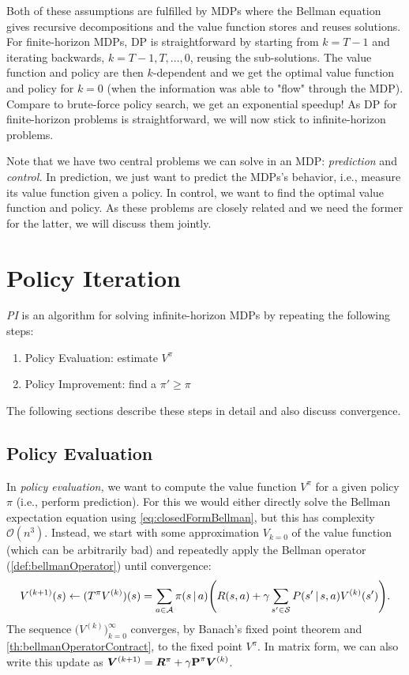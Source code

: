 	Both of these assumptions are fulfilled by \acp{MDP} where the Bellman equation gives recursive decompositions and the value function stores and reuses solutions. For finite-horizon \acp{MDP}, \ac{DP} is straightforward by starting from \(k = T - 1\) and iterating backwards, \(k = T - 1, T, \dots, 0\), reusing the sub-solutions. The value function and policy are then \(k\)-dependent and we get the optimal value function and policy for \(k = 0\) (when the information was able to "flow" through the \ac{MDP}). Compare to brute-force policy search, we get an exponential speedup! As \ac{DP} for finite-horizon problems is straightforward, we will now stick to infinite-horizon problems.

	Note that we have two central problems we can solve in an \ac{MDP}: \emph{prediction} and \emph{control.} In prediction, we just want to predict the \acp{MDP}'s behavior, i.e., measure its value function given a policy. In control, we want to find the optimal value function and policy. As these problems are closely related and we need the former for the latter, we will discuss them jointly.

	\section{Policy Iteration}
		\emph{\ac{PI}} is an algorithm for solving infinite-horizon \acp{MDP} by repeating the following steps:
		\begin{enumerate}
			\item Policy Evaluation: estimate \(V^\pi\)
			\item Policy Improvement: find a \(\pi' \geq \pi\)
		\end{enumerate}
		The following sections describe these steps in detail and also discuss convergence.

		\subsection{Policy Evaluation}
			In \emph{policy evaluation,} we want to compute the value function \(V^\pi\) for a given policy \(\pi\) (i.e., perform prediction). For this we would either directly solve the Bellman expectation equation using \eqref{eq:closedFormBellman}, but this has complexity \(\mathcal{O}(n^3)\). Instead, we start with some approximation \( V_{k = 0} \) of the value function (which can be arbitrarily bad) and repeatedly apply the Bellman operator (\autoref{def:bellmanOperator}) until convergence:
			\begin{equation}
				V^{(k + 1)}(s)
					\gets (T^\pi V^{(k)})(s)
					= \sum_{a \in \mathcal{A}} \pi(s \,\vert\, a) \Biggl( R(s, a) + \gamma \sum_{s' \in \mathcal{S}} P(s' \,\vert\, s, a) V^{(k)}(s') \Biggr).
			\end{equation}
			The sequence \(\bigl(V^{(k)}\bigr)_{k = 0}^{\infty}\) converges, by Banach's fixed point theorem and \autoref{th:bellmanOperatorContract}, to the fixed point \(V^\pi\). In matrix form, we can also write this update as \( \bm{V}^{(k + 1)} = \bm{R}^\pi + \gamma \bm{\mathrm{P}}^\pi \bm{V}^{(k)} \).

